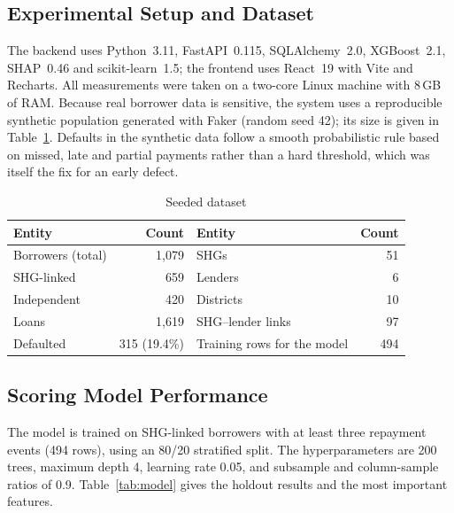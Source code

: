 \documentclass[11pt,a4paper]{article}
\begin{document}
\subsection{Experimental Setup and Dataset}
The backend uses Python~3.11, FastAPI~0.115, SQLAlchemy~2.0, XGBoost~2.1,
SHAP~0.46 and scikit-learn~1.5; the frontend uses React~19 with Vite and
Recharts. All measurements were taken on a two-core Linux machine with
8\,GB of RAM. Because real borrower data is sensitive, the system uses a
reproducible synthetic population generated with Faker (random seed 42);
its size is given in Table~\ref{tab:data}. Defaults in the synthetic data
follow a smooth probabilistic rule based on missed, late and partial
payments rather than a hard threshold, which was itself the fix for an
early defect.

\begin{table}[H]
\centering
\caption{Seeded dataset}
\label{tab:data}
\small
\begin{tabular}{@{}lr@{\hskip 1.5cm}lr@{}}
\toprule
\textbf{Entity} & \textbf{Count} & \textbf{Entity} & \textbf{Count}\\
\midrule
Borrowers (total) & 1{,}079 & SHGs & 51\\
\quad SHG-linked & 659 & Lenders & 6\\
\quad Independent & 420 & Districts & 10\\
Loans & 1{,}619 & SHG--lender links & 97\\
\quad Defaulted & 315 (19.4\%) & Training rows for the model & 494\\
\bottomrule
\end{tabular}
\end{table}

\subsection{Scoring Model Performance}
The model is trained on SHG-linked borrowers with at least three repayment
events (494 rows), using an 80/20 stratified split. The hyperparameters are
200 trees, maximum depth 4, learning rate 0.05, and subsample and
column-sample ratios of 0.9. Table~\ref{tab:model} gives the holdout
results and the most important features.
\end{document}
